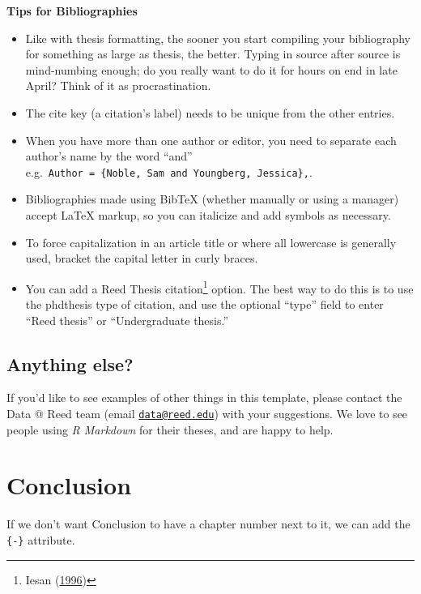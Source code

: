 \documentclass[msc,numbers]{coppe}
\providecommand{\tightlist}{%
  \setlength{\itemsep}{0pt}\setlength{\parskip}{0pt}}
\begin{document}
  \textbf{Tips for Bibliographies}
  \begin{itemize}
  \tightlist
  \item
    Like with thesis formatting, the sooner you start compiling your bibliography for something as large as thesis, the better. Typing in source after source is mind-numbing enough; do you really want to do it for hours on end in late April? Think of it as procrastination.
  \item
    The cite key (a citation's label) needs to be unique from the other entries.
  \item
    When you have more than one author or editor, you need to separate each author's name by the word ``and'' e.g.~\texttt{Author\ =\ \{Noble,\ Sam\ and\ Youngberg,\ Jessica\},}.
  \item
    Bibliographies made using BibTeX (whether manually or using a manager) accept LaTeX markup, so you can italicize and add symbols as necessary.
  \item
    To force capitalization in an article title or where all lowercase is generally used, bracket the capital letter in curly braces.
  \item
    You can add a Reed Thesis citation\footnote{Iesan (\protect\hyperlink{ref-article-example}{1996})} option. The best way to do this is to use the phdthesis type of citation, and use the optional ``type'' field to enter ``Reed thesis'' or ``Undergraduate thesis.''
  \end{itemize}
  \hypertarget{anything-else}{%
  \section{Anything else?}\label{anything-else}}
  
  If you'd like to see examples of other things in this template, please contact the Data @ Reed team (email \href{mailto:data@reed.edu}{\nolinkurl{data@reed.edu}}) with your suggestions. We love to see people using \emph{R Markdown} for their theses, and are happy to help.
  
  \hypertarget{conclusion}{%
  \chapter*{Conclusion}\label{conclusion}}
  
  If we don't want Conclusion to have a chapter number next to it, we can add the \texttt{\{-\}} attribute.
  
\end{document}
